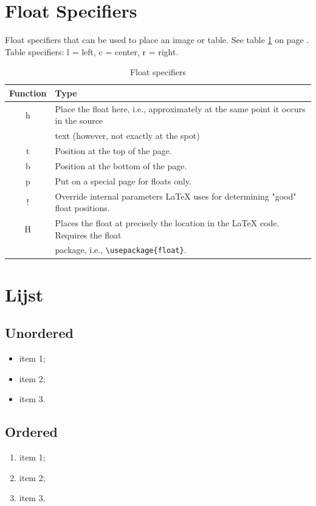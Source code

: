 \documentclass[a4paper, 11pt]{report}
\begin{document}
\section{Float Specifiers}
Float specifiers that can be used to place an image or table. See table \ref{float-specifiers} on page \pageref{float-specifiers}. Table specifiers: l = left, c = center, r = right.
\begin{table}[hb]
	\caption{Float specifiers}
	\centering
	\begin{tabular}{cl}
		\toprule
		Function & Type \\
		\midrule
		h & Place the float here, i.e., approximately at the same point it occurs in the source \\ & text (however, not exactly at the spot)  \\
		t & Position at the top of the page. \\
		b & Position at the bottom of the page. \\
		p & Put on a special page for floats only. \\
		! & Override internal parameters LaTeX uses for determining "good" float positions. \\
		H & Places the float at precisely the location in the LaTeX code. Requires the float \\ & package, i.e., \verb|\usepackage{float}|. \\
		\bottomrule
	\end{tabular}
	\label{float-specifiers}
\end{table}

\section{Lijst}
\subsection{Unordered}
\begin{itemize}
	\item item 1;
	\item item 2;
	\item item 3.
\end{itemize}
\subsection{Ordered}
\begin{enumerate}
	\item item 1;
	\item item 2;
	\item item 3.
\end{enumerate}
\end{document}
